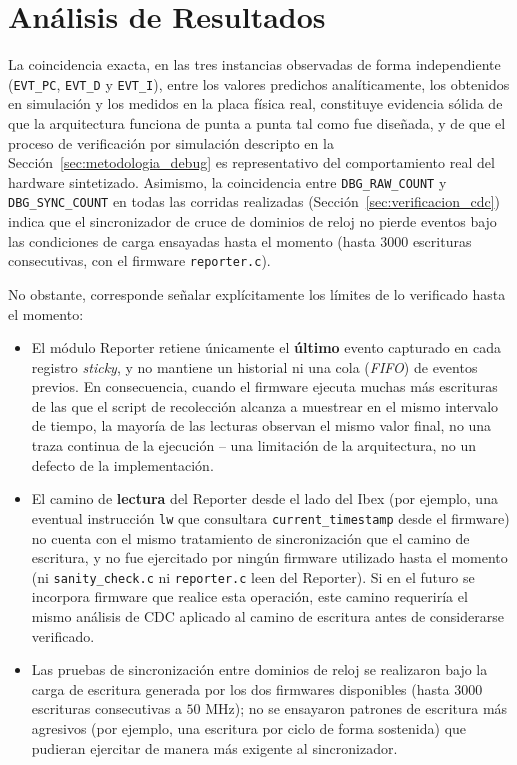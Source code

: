 
\section{Análisis de Resultados}
\label{sec:analisis_resultados}

La coincidencia exacta, en las tres instancias observadas de forma
independiente (\texttt{EVT\_PC}, \texttt{EVT\_D} y \texttt{EVT\_I}), entre
los valores predichos analíticamente, los obtenidos en simulación y los
medidos en la placa física real, constituye evidencia sólida de que la
arquitectura funciona de punta a punta tal como fue diseñada, y de que el
proceso de verificación por simulación descripto en la
Sección~\ref{sec:metodologia_debug} es representativo del comportamiento
real del hardware sintetizado. Asimismo, la coincidencia entre
\texttt{DBG\_RAW\_COUNT} y \texttt{DBG\_SYNC\_COUNT} en todas las corridas
realizadas (Sección~\ref{sec:verificacion_cdc}) indica que el
sincronizador de cruce de dominios de reloj no pierde eventos bajo las
condiciones de carga ensayadas hasta el momento (hasta $3000$ escrituras
consecutivas, con el firmware \texttt{reporter.c}).

No obstante, corresponde señalar explícitamente los límites de lo
verificado hasta el momento:

\begin{itemize}
    \item El módulo Reporter retiene únicamente el \textbf{último} evento
    capturado en cada registro \textit{sticky}, y no mantiene un historial
    ni una cola (\textit{FIFO}) de eventos previos. En consecuencia,
    cuando el firmware ejecuta muchas más escrituras de las que el script
    de recolección alcanza a muestrear en el mismo intervalo de tiempo, la
    mayoría de las lecturas observan el mismo valor final, no una traza
    continua de la ejecución -- una limitación de la arquitectura, no un
    defecto de la implementación.
    \item El camino de \textbf{lectura} del Reporter desde el lado del
    Ibex (por ejemplo, una eventual instrucción \texttt{lw} que consultara
    \texttt{current\_timestamp} desde el firmware) no cuenta con el mismo
    tratamiento de sincronización que el camino de escritura, y no fue
    ejercitado por ningún firmware utilizado hasta el momento (ni
    \texttt{sanity\_check.c} ni \texttt{reporter.c} leen del Reporter). Si
    en el futuro se incorpora firmware que realice esta operación, este
    camino requeriría el mismo análisis de CDC aplicado al camino de
    escritura antes de considerarse verificado.
    \item Las pruebas de sincronización entre dominios de reloj se
    realizaron bajo la carga de escritura generada por los dos firmwares
    disponibles (hasta $3000$ escrituras consecutivas a $50\text{ MHz}$);
    no se ensayaron patrones de escritura más agresivos (por ejemplo, una
    escritura por ciclo de forma sostenida) que pudieran ejercitar de
    manera más exigente al sincronizador.
\end{itemize}

